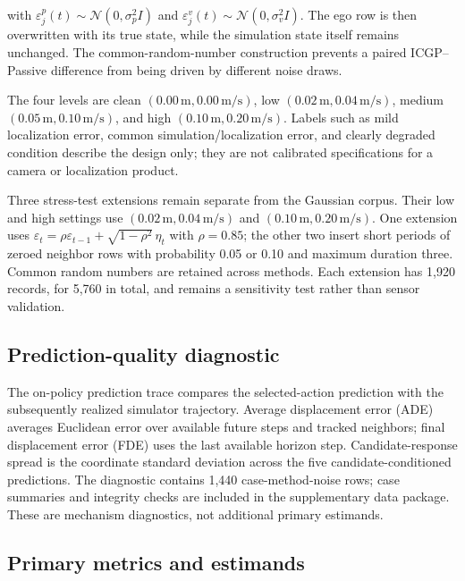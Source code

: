 \documentclass[pdflatex,sn-mathphys-num]{sn-jnl}
\begin{document}
with $\varepsilon^p_j(t)\sim\mathcal{N}(0,\sigma_p^2 I)$ and $\varepsilon^v_j(t)\sim\mathcal{N}(0,\sigma_v^2 I)$. The ego row is then overwritten with its true state, while the simulation state itself remains unchanged. The common-random-number construction prevents a paired ICGP--Passive difference from being driven by different noise draws.

The four levels are clean $(0.00\,\mathrm{m},0.00\,\mathrm{m/s})$, low $(0.02\,\mathrm{m},0.04\,\mathrm{m/s})$, medium $(0.05\,\mathrm{m},0.10\,\mathrm{m/s})$, and high $(0.10\,\mathrm{m},0.20\,\mathrm{m/s})$. Labels such as mild localization error, common simulation/localization error, and clearly degraded condition describe the design only; they are not calibrated specifications for a camera or localization product.

Three stress-test extensions remain separate from the Gaussian corpus. Their low and high settings use $(0.02\,\mathrm{m},0.04\,\mathrm{m/s})$ and $(0.10\,\mathrm{m},0.20\,\mathrm{m/s})$. One extension uses $\varepsilon_t=\rho\varepsilon_{t-1}+\sqrt{1-\rho^2}\,\eta_t$ with $\rho=0.85$; the other two insert short periods of zeroed neighbor rows with probability 0.05 or 0.10 and maximum duration three. Common random numbers are retained across methods. Each extension has 1,920 records, for 5,760 in total, and remains a sensitivity test rather than sensor validation.

\subsection{Prediction-quality diagnostic}

The on-policy prediction trace compares the selected-action prediction with the subsequently realized simulator trajectory. Average displacement error (ADE) averages Euclidean error over available future steps and tracked neighbors; final displacement error (FDE) uses the last available horizon step. Candidate-response spread is the coordinate standard deviation across the five candidate-conditioned predictions. The diagnostic contains 1,440 case-method-noise rows; case summaries and integrity checks are included in the supplementary data package. These are mechanism diagnostics, not additional primary estimands.

\subsection{Primary metrics and estimands}
\end{document}
